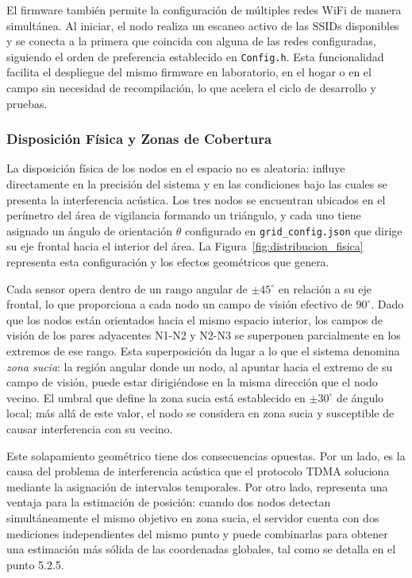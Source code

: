 El firmware también permite la configuración de múltiples redes WiFi de manera simultánea. Al iniciar, el nodo realiza un escaneo activo de las SSIDs disponibles y se conecta a la primera que coincida con alguna de las redes configuradas, siguiendo el orden de preferencia establecido en \texttt{Config.h}. Esta funcionalidad facilita el despliegue del mismo firmware en laboratorio, en el hogar o en el campo sin necesidad de recompilación, lo que acelera el ciclo de desarrollo y pruebas.


\subsubsection*{Disposición Física y Zonas de Cobertura}

La disposición física de los nodos en el espacio no es aleatoria: influye directamente en la precisión del sistema y en las condiciones bajo las cuales se presenta la interferencia acústica. Los tres nodos se encuentran ubicados en el perímetro del área de vigilancia formando un triángulo, y cada uno tiene asignado un ángulo de orientación $\theta$ configurado en \texttt{grid\_config.json} que dirige su eje frontal hacia el interior del área. La Figura~\ref{fig:distribucion_fisica} representa esta configuración y los efectos geométricos que genera.

Cada sensor opera dentro de un rango angular de $\pm 45^{\circ}$ en relación a su eje frontal, lo que proporciona a cada nodo un campo de visión efectivo de $90^{\circ}$. Dado que los nodos están orientados hacia el mismo espacio interior, los campos de visión de los pares adyacentes N1-N2 y N2-N3 se superponen parcialmente en los extremos de ese rango. Esta superposición da lugar a lo que el sistema denomina \textit{zona sucia}: la región angular donde un nodo, al apuntar hacia el extremo de su campo de visión, puede estar dirigiéndose en la misma dirección que el nodo vecino. El umbral que define la zona sucia está establecido en $\pm 30^{\circ}$ de ángulo local; más allá de este valor, el nodo se considera en zona sucia y susceptible de causar interferencia con su vecino.

Este solapamiento geométrico tiene dos consecuencias opuestas. Por un lado, es la causa del problema de interferencia acústica que el protocolo TDMA soluciona mediante la asignación de intervalos temporales. Por otro lado, representa una ventaja para la estimación de posición: cuando dos nodos detectan simultáneamente el mismo objetivo en zona sucia, el servidor cuenta con dos mediciones independientes del mismo punto y puede combinarlas para obtener una estimación más sólida de las coordenadas globales, tal como se detalla en el punto 5.2.5.

